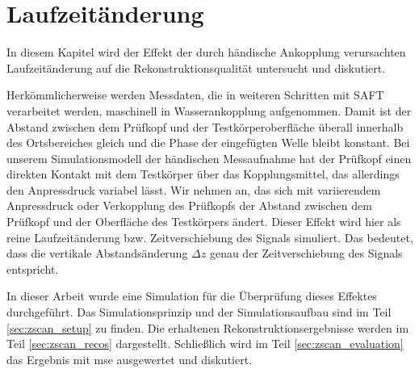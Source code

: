 \chapter{Laufzeitänderung} \label{chap:zscan}

In diesem Kapitel wird der Effekt der durch händische Ankopplung verursachten Laufzeitänderung auf die Rekonstruktionsqualität untersucht und diskutiert. \par
Herkömmlicherweise werden Messdaten, die in weiteren Schritten mit SAFT verarbeitet werden, maschinell in Wasserankopplung aufgenommen. Damit ist der Abstand zwischen dem Prüfkopf und der Testkörperoberfläche überall innerhalb des Ortsbereiches gleich und die Phase der eingefügten Welle bleibt konstant. Bei unserem Simulationsmodell der händischen Messaufnahme hat der Prüfkopf einen direkten Kontakt mit dem Testkörper über das Kopplungsmittel, das allerdings den Anpressdruck variabel lässt. Wir nehmen an, das sich mit variierendem Anpressdruck oder Verkopplung des Prüfkopfs der Abstand zwischen dem Prüfkopf und der Oberfläche des Testkörpers ändert. Dieser Effekt wird hier als reine Laufzeitänderung bzw. Zeitverschiebung des Signals simuliert. Das bedeutet, dass die vertikale Abstandsänderung $\Delta z$ genau der Zeitverschiebung des Signals entspricht. \par
In dieser Arbeit wurde eine Simulation für die Überprüfung dieses Effektes durchgeführt. Das Simulationsprinzip und der Simulationsaufbau sind im Teil \ref{sec:zscan_setup} zu finden. Die erhaltenen Rekonstruktionsergebnisse werden im Teil \ref{sec:zscan_recos} dargestellt. Schließlich wird im Teil \ref{sec:zscan_evaluation} das Ergebnis mit \acrshort{mse} ausgewertet und diskutiert. \par



